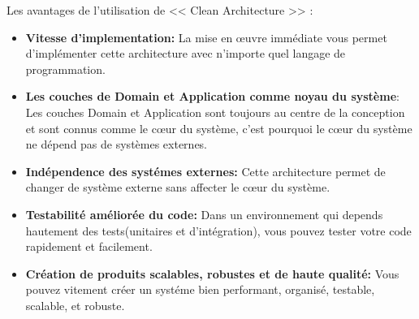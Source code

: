 \noindent
Les avantages de l’utilisation de  << Clean Architecture >> :

\begin{itemize}[label={---}]
    \item \small\textbf{Vitesse d'implementation: } La mise en œuvre immédiate vous permet d'implémenter cette architecture avec n'importe quel langage de programmation.

    \item \small\textbf{Les couches de Domain et Application comme noyau du système}: Les couches Domain et Application sont toujours au centre de la conception et sont connus comme le cœur du système, c'est pourquoi le cœur du système ne dépend pas de systèmes externes. 

    \item \small\textbf{Indépendence des systémes externes: } Cette architecture permet de changer de système externe sans affecter le cœur du système.

    \item \small\textbf{Testabilité améliorée du code: } Dans un environnement qui depends hautement des tests(unitaires et d'intégration), vous pouvez tester votre code rapidement et facilement.    

    \item \small\textbf{Création de produits scalables, robustes et de haute qualité: } Vous pouvez vitement créer un systéme bien performant, organisé, testable, scalable, et robuste.
\end{itemize}
\noindent

\newpage